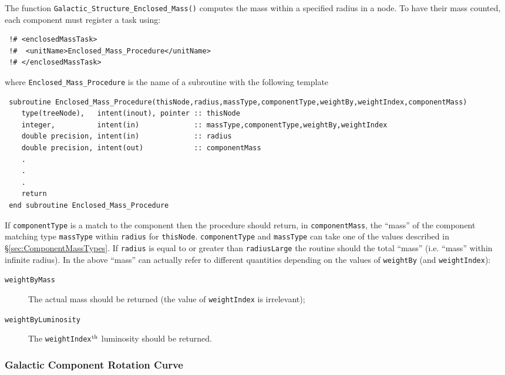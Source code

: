 The function {\tt Galactic\_Structure\_Enclosed\_Mass()} computes the mass within a specified radius in a node. To have their mass counted, each component must register a task using:
\begin{verbatim}
 !# <enclosedMassTask>
 !#  <unitName>Enclosed_Mass_Procedure</unitName>
 !# </enclosedMassTask>
\end{verbatim}
where {\tt Enclosed\_Mass\_Procedure} is the name of a subroutine with the following template
\begin{verbatim}
 subroutine Enclosed_Mass_Procedure(thisNode,radius,massType,componentType,weightBy,weightIndex,componentMass)
    type(treeNode),   intent(inout), pointer :: thisNode
    integer,          intent(in)             :: massType,componentType,weightBy,weightIndex
    double precision, intent(in)             :: radius
    double precision, intent(out)            :: componentMass
    .
    .
    .
    return
 end subroutine Enclosed_Mass_Procedure
\end{verbatim}
If {\tt componentType} is a match to the component then the procedure should return, in {\tt componentMass}, the ``mass'' of the component matching type {\tt massType} within {\tt radius} for {\tt thisNode}.  {\tt componentType} and {\tt massType} can take one of the values described in \S\ref{sec:ComponentMassTypes}.
If {\tt radius} is equal to or greater than {\tt radiusLarge} the routine should the total ``mass'' (i.e. ``mass'' within infinite radius). In the above ``mass'' can actually refer to different quantities depending on the values of {\tt weightBy} (and {\tt weightIndex}):
\begin{description}
\item [{\tt weightByMass}] The actual mass should be returned (the value of {\tt weightIndex} is irrelevant);
\item [{\tt weightByLuminosity}] The {\tt weightIndex}$^{\rm th}$ luminosity should be returned.
\end{description}

\subsubsection{Galactic Component Rotation Curve}

